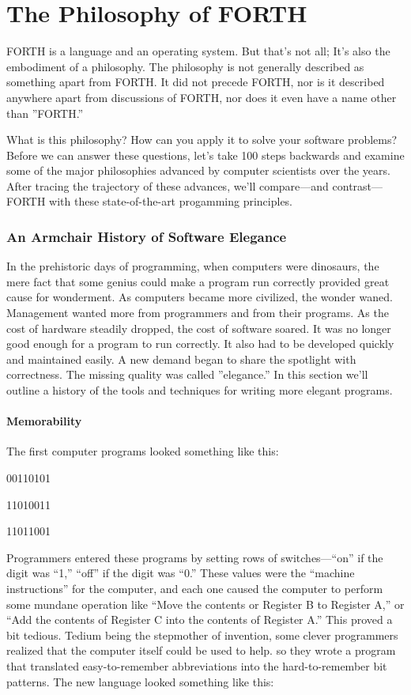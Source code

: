 \part{The Philosophy of FORTH}

FORTH is a language and an operating system. But that's not all; It's
also the embodiment of a philosophy. The philosophy is not generally
described as something apart from FORTH. It did not precede FORTH,
nor is it described anywhere apart from discussions of FORTH, nor
does it even have a name other than ''FORTH.''

What is this philosophy? How can you apply it to solve your software
problems? Before we can answer these questions, let's take 100 steps
backwards and examine some of the major philosophies advanced by computer
scientists over the years. After tracing the trajectory of these advances,
we'll compare---and contrast---FORTH with these state-of-the-art progamming
principles.


\section*{An Armchair History of Software Elegance}

In the prehistoric days of programming, when computers were dinosaurs,
the mere fact that some genius could make a program run correctly
provided great cause for wonderment. As computers became more civilized,
the wonder waned. Management wanted more from programmers and from
their programs. As the cost of hardware steadily dropped, the cost
of software soared. It was no longer good enough for a program to
run correctly. It also had to be developed quickly and maintained
easily. A new demand began to share the spotlight with correctness.
The missing quality was called ''elegance.'' In this section we'll
outline a history of the tools and techniques for writing more elegant
programs.


\subsection*{Memorability}

The first computer programs looked something like this:

\begin{lyxcode}
00110101

11010011

11011001
\end{lyxcode}
Programmers entered these programs by setting rows of switches---``on''
if the digit was {}``1,'' ``off'' if the digit was ``0.'' These
values were the {}``machine instructions'' for the computer, and
each one caused the computer to perform some mundane operation like
``Move the contents or Register B to Register A,'' or {}``Add the
contents of Register C into the contents of Register A.'' This proved
a bit tedious. Tedium being the stepmother of invention, some clever
programmers realized that the computer itself could be used to help.
so they wrote a program that translated easy-to-remember abbreviations
into the hard-to-remember bit patterns. The new language looked something
like this:


